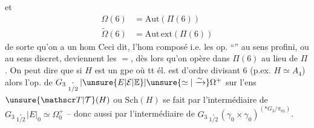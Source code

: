 et 
\[
\begin{aligned}
\Omega(6)&=\mathrm{Aut}(\Pi(6))\\
\widetilde{\Omega}(6)&=\mathrm{Aut}\,\mathrm{ext}(\Pi(6))
\end{aligned}
\]
de sorte qu'on a un hom 
Ceci dit, l'hom composé
i.e. les op. ``'' au sens profini, ou au sens discret, deviennent les $=$, dès lors qu'on opère dans $\Pi(6)$ au lieu de $\Pi$. On peut dire que si $H$ est un gpe où tt él. est d'ordre divisant $6$ (p.ex. $H\simeq A_4$) alors l'op. de $G_3\underset{1/2}{\cdot}|\unsure{E|\mathcal E|\mathbb E}|\unsure{\simeq|\xrightarrow{\sim}}\Omega^+$ sur l'ens $\unsure{\mathscr T|\mathcal T}(H)$ ou $\mathrm{Sch}(H)$ se fait par l'intermédiaire de $G_3\underset{1/2}{\cdot}|E|_0\simeq\Omega_0^+$ -- donc aussi par l'intermédiaire de $G_3\underset{1/2}{\cdot}(\gamma_0\times\gamma_0)^{(*G_3/\pi_{01})}$.
